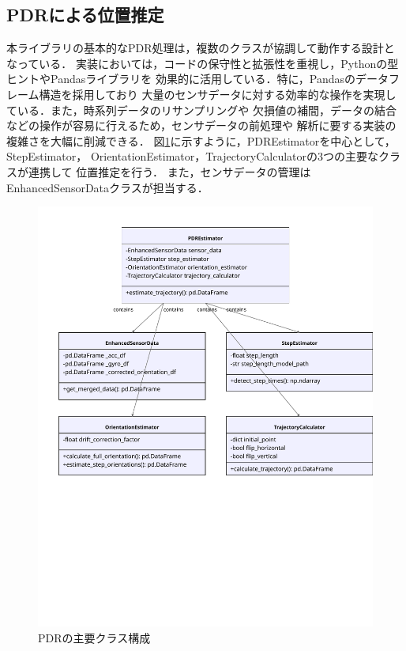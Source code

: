 
\subsection{PDRによる位置推定}

本ライブラリの基本的なPDR処理は，複数のクラスが協調して動作する設計となっている．
実装においては，コードの保守性と拡張性を重視し，Pythonの型ヒントやPandasライブラリを
効果的に活用している．特に，Pandasのデータフレーム構造を採用しており
大量のセンサデータに対する効率的な操作を実現している．また，時系列データのリサンプリングや
欠損値の補間，データの結合などの操作が容易に行えるため，センサデータの前処理や
解析に要する実装の複雑さを大幅に削減できる．
図\ref{fig:pdr-class}に示すように，PDREstimatorを中心として，StepEstimator，
OrientationEstimator，TrajectoryCalculatorの3つの主要なクラスが連携して
位置推定を行う．
また，センサデータの管理はEnhancedSensorDataクラスが担当する．

\begin{figure}[H]
    \centering
    \includegraphics[width=\linewidth]{../image/pdr_figure.pdf}
    \caption{PDRの主要クラス構成}
    \label{fig:pdr-class}
\end{figure}

